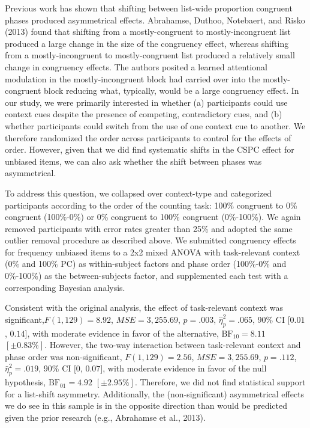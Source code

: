 \documentclass[english,,man,floatsintext]{apa6}
\begin{document}
Previous work has shown that shifting between list-wide proportion congruent phases produced asymmetrical effects. Abrahamse, Duthoo, Notebaert, and Risko (2013) found that shifting from a mostly-congruent to mostly-incongruent list produced a large change in the size of the congruency effect, whereas shifting from a mostly-incongruent to mostly-congruent list produced a relatively small change in congruency effects. The authors posited a learned attentional modulation in the mostly-incongruent block had carried over into the mostly-congruent block reducing what, typically, would be a large congruency effect. In our study, we were primarily interested in whether (a) participants could use context cues despite the presence of competing, contradictory cues, and (b) whether participants could switch from the use of one context cue to another. We therefore randomized the order across participants to control for the effects of order. However, given that we did find systematic shifts in the CSPC effect for unbiased items, we can also ask whether the shift between phases was asymmetrical.

To address this question, we collapsed over context-type and categorized participants according to the order of the counting task: 100\% congruent to 0\% congruent (100\%-0\%) or 0\% congruent to 100\% congruent (0\%-100\%). We again removed participants with error rates greater than 25\% and adopted the same outlier removal procedure as described above. We submitted congruency effects for frequency unbiased items to a 2x2 mixed ANOVA with task-relevant context (0\% and 100\% PC) as within-subject factors and phase order (100\%-0\% and 0\%-100\%) as the between-subjects factor, and supplemented each test with a corresponding Bayesian analysis.

Consistent with the original analysis, the effect of task-relevant context was significant,\(F(1, 129) = 8.92\), \(\mathit{MSE} = 3,255.69\), \(p = .003\), \(\hat{\eta}^2_p = .065\), 90\% CI \([0.01\), \(0.14]\), with moderate evidence in favor of the alternative, \(\mathrm{BF}_{\textrm{10}} = 8.11\) \([\pm 0.83\%]\). However, the two-way interaction between task-relevant context and phase order was non-significant, \(F(1, 129) = 2.56\), \(\mathit{MSE} = 3,255.69\), \(p = .112\), \(\hat{\eta}^2_p = .019\), 90\% CI \([0\), \(0.07]\), with moderate evidence in favor of the null hypothesis, \(\mathrm{BF}_{\textrm{01}} = 4.92\) \([\pm 2.95\%]\). Therefore, we did not find statistical support for a list-shift asymmetry. Additionally, the (non-significant) asymmetrical effects we do see in this sample is in the opposite direction than would be predicted given the prior research (e.g., Abrahamse et al., 2013).
\end{document}
